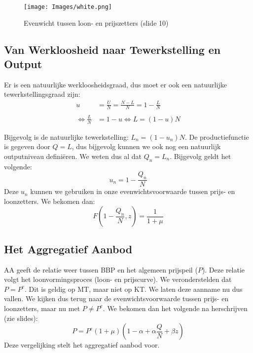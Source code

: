 \begin{figure}[htbp]
	\centering
	\texttt{[image: Images/white.png]}
	\caption{Evenwicht tussen loon- en prijszetters (slide 10)}
	\label{fig:evenwichtLoonPrijsZetters}
\end{figure}


\subsection{Van Werkloosheid naar Tewerkstelling en Output}
Er is een natuurlijke werkloosheidsgraad, dus moet er ook een natuurlijke tewerkstellingsgraad zijn:
\begin{align*}
  u &= \frac{U}{N} = \frac{N-L}{N} = 1-\frac{L}{N}\\
  \\ \Leftrightarrow \frac{L}{N} & = 1-u \Leftrightarrow L = (1-u)N
\end{align*}

Bijgevolg is de natuurlijke tewerkstelling: $L_n = (1 - u_n)N$. De productiefunctie is gegeven door $Q = L$, dus bijgevolg kunnen we ook nog een natuurlijk outputniveau defini\"eren. We weten dus al dat $Q_n = L_n$. Bijgevolg geldt het volgende:
\begin{equation*}
  u_n = 1 - \frac{Q_n}{N}
\end{equation*}
Deze $u_n$ kunnen we gebruiken in onze evenwichtsvoorwaarde tussen prijs- en loonzetters. We bekomen dan:
\begin{equation}
  F(1-\frac{Q_n}{N}, z) = \frac{1}{1+\mu}
\end{equation}


\subsection{Het Aggregatief Aanbod}
AA geeft de relatie weer tussen BBP en het algemeen prijspeil ($P$). Deze relatie volgt het loonvormingsproces (loon- en prijscurve). We veronderstelden dat $P = P^e$. Dit is geldig op MT, maar niet op KT. We laten deze aanname nu dus vallen. We kijken dus terug naar de evenwichtsvoorwaarde tussen prijs- en loonzetters, maar nu met $P \ne P^e$. We bekomen dan het volgende na herschrijven (zie slides):
\begin{equation}
  P = P^e(1 + \mu)(1-\alpha+\alpha \frac{Q}{N}+\beta z)
\end{equation}
Deze vergelijking stelt het aggregatief aanbod voor.
